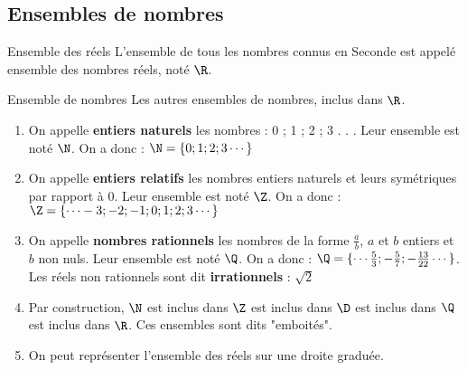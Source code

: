 \begin{pageCours}

\section{Ensembles de nombres}

\begin{DefT}{Ensemble des réels}
L'ensemble de tous les nombres connus en Seconde est appelé ensemble des nombres réels, noté $\R$.
\end{DefT}

\begin{DefT}{Ensemble de nombres}
Les autres ensembles de nombres, inclus dans $\R$.
\begin{enumerate}
\item On appelle \textbf{entiers naturels} les nombres : 0 ; 1 ; 2 ; 3 . . . Leur ensemble est noté $\N$.
On a donc : $\N =  \lbrace 0 ; 1 ; 2 ; 3 \cdots \rbrace $
\item  On appelle \textbf{entiers relatifs} les nombres entiers naturels et leurs symétriques par rapport à 0. Leur ensemble est noté $\Z$.
On a donc : $\Z = \lbrace \cdots -3 ; -2 ; -1 ; 0 ; 1 ; 2 ; 3  \cdots  \rbrace$
\item  On appelle \textbf{nombres rationnels} les nombres de la forme $\frac{a}{b}$, $a$ et $b$ entiers et $b$ non nuls.  Leur ensemble est noté $\Q$. 
On a donc : $\Q = \lbrace \cdots \frac{5}{3} ; -\frac{5}{7} ; -\frac{13}{22} \cdots   \rbrace$. Les réels non rationnels sont dit \textbf{irrationnels} : $\sqrt{2}$
\item Par construction, $\N$ est inclus dans $\Z$  est inclus dans $\D$  est inclus dans $\Q$  est inclus dans $\R$. Ces ensembles sont dits "emboités".
\item  On peut représenter l'ensemble des réels sur une droite graduée.
\begin{center}
 \end{center} 
\end{enumerate}
\end{DefT}



\end{pageCours}
